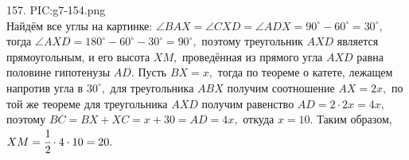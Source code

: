 157. {{PIC:g7-154.png}}\\
Найдём все углы на картинке: $\angle BAX=\angle CXD=\angle ADX=90^\circ-60^\circ=30^\circ,$ тогда $\angle AXD=180^\circ-60^\circ-30^\circ=90^\circ,$ поэтому треугольник $AXD$ является прямоугольным, и его высота $XM,$ проведённая из прямого угла $AXD$ равна половине гипотенузы $AD.$ Пусть $BX=x,$ тогда по теореме о катете, лежащем напротив угла в $30^\circ,$ для треугольника $ABX$ получим соотношение $AX=2x,$ по той же теореме для треугольника $AXD$ получим равенство $AD=2\cdot2x=4x,$ поэтому $BC=BX+XC=x+30=AD=4x,$ откуда $x=10.$ Таким образом, $XM=\cfrac{1}{2}\cdot4\cdot10=20.$\\
